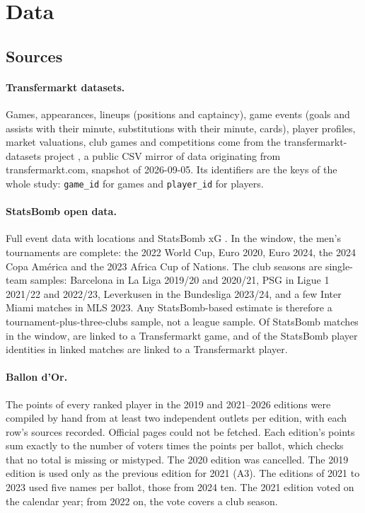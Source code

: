 \documentclass[11pt,a4paper]{article}
\begin{document}
\section{Data}
\label{sec:data}

\subsection{Sources}

\paragraph{Transfermarkt datasets.}
Games, appearances, lineups (positions and captaincy), game events (goals and
assists with their minute, substitutions with their minute, cards), player
profiles, market valuations, club games and competitions come from the
transfermarkt-datasets project \citep{transfermarktdatasets}, a public CSV
mirror of data originating from transfermarkt.com, snapshot of 2026-09-05.
Its identifiers are the keys of the whole study: \texttt{game\_id} for games and
\texttt{player\_id} for players.

\paragraph{StatsBomb open data.}
Full event data with locations and StatsBomb xG \citep{statsbombopendata}. In
the window, the men's tournaments are complete: the 2022 World Cup, Euro 2020,
Euro 2024, the 2024 Copa Am\'erica and the 2023 Africa Cup of Nations. The club
seasons are single-team samples: Barcelona in La Liga 2019/20 and 2020/21, PSG
in Ligue 1 2021/22 and 2022/23, Leverkusen in the Bundesliga 2023/24, and a few
Inter Miami matches in MLS 2023. Any StatsBomb-based estimate is therefore a
tournament-plus-three-clubs sample, not a league sample. Of \NSbMatches{}
StatsBomb matches in the window, \NSbMatchesLinked{} are linked to a
Transfermarkt game, and \SbPlayerLinkRate{} of the StatsBomb player identities
in linked matches are linked to a Transfermarkt player.

\paragraph{Ballon d'Or.}
The points of every ranked player in the 2019 and 2021--2026 editions were
compiled by hand from at least two independent outlets per edition, with each
row's sources recorded. Official pages could not be fetched. Each edition's
points sum exactly to the number of voters times the points per ballot, which
checks that no total is missing or mistyped. The 2020 edition was cancelled.
The 2019 edition is used only as the previous edition for 2021 (A3). The
editions of 2021 to 2023 used five names per ballot, those from 2024 ten.
The 2021 edition voted on the calendar year; from 2022 on, the vote covers a
club season.
\end{document}
